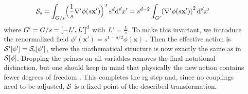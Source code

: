 \begin{align*}
\sact_{\s} &= \int_{G/s}\kla[\Big]{ \frac{1}{s} \nabla' \phi(s\textbf{x}')}^2 \,s^d\d^dx' = s^{d-2} \int_{G'} \kla*{\nabla'\phi(s\textbf{x}')}^2\,\d^dx'
\end{align*}
where $G'=G/s = \klb*{-L', L'}^d$ with $L'=\frac{L}{s}$.
To make this invariant, we introduce the renormalized field $\phi'(\textbf{x}') = s^{1-d/2} \phi(\textbf{x})$ \cite[]{AltlandSimons}.
Then the effective action is $\sact'[\phi'] = \sact_\s[\phi']$, where the mathematical structure is now exactly the same as in $\sact[\phi]$.
Dropping the primes on all variables removes the final notational distinction, but one should keep in mind that physically the new action contains fewer degrees of freedom \cite[]{Bosonization_Schulz_1995}.
This completes the \gls{rg} step and, since no couplings need to be adjusted, $\sact$ is a fixed point of the described transformation.
